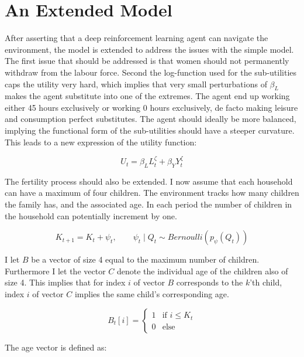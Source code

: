 \section{An Extended Model}

After asserting that a deep reinforcement learning agent can navigate the environment, the model is extended to address the issues with the simple model. The first issue that should be addressed is that women should not permanently withdraw from the labour force. Second the log-function used for the sub-utilities caps the utility very hard, which implies that very small perturbations of $\beta_L$ makes the agent substitute into one of the extremes. The agent end up working either 45 hours exclusively or working 0 hours exclusively, de facto making leisure and consumption perfect substitutes. The agent should ideally be more balanced, implying the functional form of the sub-utilities should have a steeper curvature. This leads to a new expression of the utility function:

\begin{equation}
    U_t = \beta_L L_{t}^\zeta + \beta_Y Y_t^{\zeta}
\end{equation}

The fertility process should also be extended. I now assume that each household can have a maximum of four children. The environment tracks how many children the family has, and the associated age. In each period the number of children in the household can potentially increment by one.

\begin{equation}
    K_{t+1} = K_t+ \psi_t, \qquad \psi_t \mid Q_t \sim Bernoulli (p_\psi(Q_t))
\end{equation}

I let $B$ be a vector of size 4 equal to the maximum number of children. Furthermore I let the vector $C$ denote the individual age of the children also of size 4. This implies that for index $i$ of vector $B$ corresponds to the $k$'th child, index $i$ of vector $C$ implies the same child's corresponding age.

\begin{equation}
    B_t[i]  = \begin{cases}
        1 & \text{if }  i \leq K_t \\
        0 & \text{else}
    \end{cases}
\end{equation}

The age vector is defined as:

